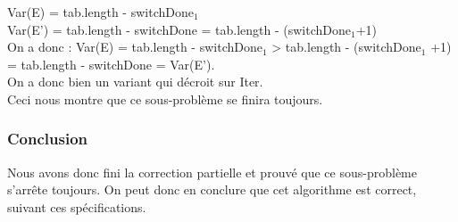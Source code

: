 \noindent Var(E) = tab.length - switchDone$_{1}$\\
Var(E') = tab.length - switchDone = tab.length - (switchDone$_{1}$+1)\\

On a donc : Var(E) = tab.length - switchDone$_{1}$ > tab.length - (switchDone$_1$ +1) = tab.length - switchDone = Var(E').\\

On a donc bien un variant qui décroit sur Iter.\\

Ceci nous montre que ce sous-problème se finira toujours. 

\subsubsection*{Conclusion}

Nous avons donc fini la correction partielle et prouvé que ce sous-problème s'arrête toujours. On peut donc en conclure que cet algorithme est correct, suivant ces spécifications. 




